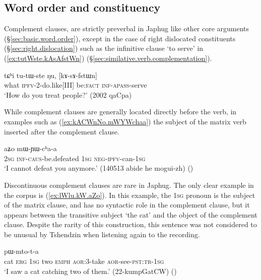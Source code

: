 \subsection{Word order and constituency}  \label{sec:complement.word.order}
Complement clauses, are strictly preverbal in Japhug like other core arguments (§\ref{sec:basic.word.order}), except in the case of right dislocated constituents (§\ref{sec:right.dislocation}) such as the infinitive clause  `to serve' in (\ref{ex:tutWste.kAsAfstWn}) (§\ref{sec:similative.verb.complementation}).

\begin{exe}
\ex \label{ex:tutWste.kAsAfstWn}
\gll tɕʰi tu-tɯ-ste ŋu, [kɤ-sɤ-fstɯn]\\
what \textsc{ipfv}-2-do.like[III] be:\textsc{fact} \textsc{inf}-\textsc{apass}-serve \\
\glt `How do you treat people?' (2002 qaCpa)
\end{exe}

While complement clauses are generally located directly before the verb, in examples such as (\ref{ex:kACWnNo.mWYWchaa}) the subject of the matrix verb inserted after the complement clause.

\begin{exe}
\ex \label{ex:kACWnNo.mWYWchaa}
 aʑo mɯ-ɲɯ-cʰa-a \\
\textsc{2sg} \textsc{inf}-\textsc{caus}-be.defeated \textsc{1sg} \textsc{neg}-\textsc{ipfv}-can-\textsc{1sg} \\
\glt `I cannot defeat you anymore.' (140513 abide he mogui-zh)
()
\end{exe}

Discontinuous complement clauses are rare in Japhug. The only clear example in the corpus is (\ref{ex:lWlu.kW.aZo}). In this example, the \textsc{1sg} pronoun  is the subject of the matrix clause, and has no syntactic role in the complement clause, but it appears between the transitive subject  `the cat' and the object  of the complement clause. Despite the rarity of this construction, this sentence was not considered to be unusual by Tshendzin when listening again to the recording.
 
 \begin{exe}
\ex \label{ex:lWlu.kW.aZo}
 pɯ-mto-t-a \\
cat \textsc{erg} \textsc{1sg} two \textsc{emph} \textsc{aor}:3\flobv{}-take \textsc{aor}-see-\textsc{pst}:\textsc{tr}-\textsc{1sg} \\
\glt `I saw a cat catching two of them.' (22-kumpGatCW)
()
\end{exe}

